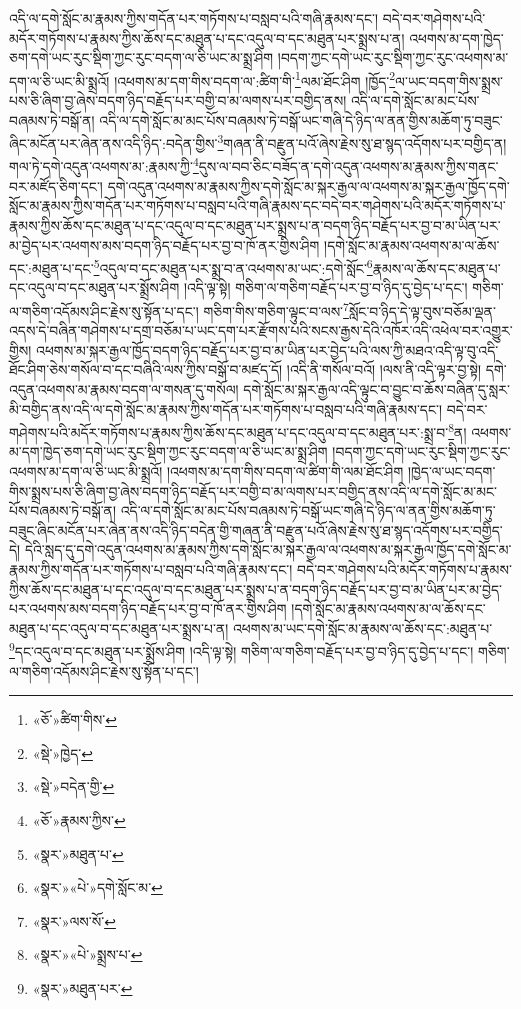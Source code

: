 འདི་ལ་དགེ་སློང་མ་རྣམས་ཀྱིས་གདོན་པར་གཏོགས་པ་བསླབ་པའི་གཞི་རྣམས་དང་། བདེ་བར་གཤེགས་པའི་མདོར་གཏོགས་པ་རྣམས་ཀྱིས་ཆོས་དང་མཐུན་པ་དང་འདུལ་བ་དང་མཐུན་པར་སྨྲས་པ་ན། འཕགས་མ་དག་ཁྱེད་ཅག་དགེ་ཡང་རུང་སྡིག་ཀྱང་རུང་བདག་ལ་ཅི་ཡང་མ་སྨྲ་ཤིག །བདག་ཀྱང་དགེ་ཡང་རུང་སྡིག་ཀྱང་རུང་འཕགས་མ་དག་ལ་ཅི་ཡང་མི་སྨྲའོ། །འཕགས་མ་དག་གིས་བདག་ལ་:ཚིག་གི་\footnote{«ཅོ་»ཚིག་གིས་}ལམ་ཐོང་ཤིག །ཁྱོད་\footnote{«སྡེ་»ཁྱེད་}ལ་ཡང་བདག་གིས་སྨྲས་པས་ཅི་ཞིག་བྱ་ཞེས་བདག་ཉིད་བརྗོད་པར་བགྱི་བ་མ་ལགས་པར་བགྱིད་ནས། འདི་ལ་དགེ་སློང་མ་མང་པོས་བཞམས་ཏེ་བསྒོ་ན། འདི་ལ་དགེ་སློང་མ་མང་པོས་བཞམས་ཏེ་བསྒོ་ཡང་གཞི་དེ་ཉིད་ལ་ནན་གྱིས་མཆོག་ཏུ་བཟུང་ཞིང་མངོན་པར་ཞེན་ནས་འདི་ཉིད་:བདེན་གྱིས་\footnote{«སྡེ་»བདེན་གྱི་}གཞན་ནི་བརྫུན་པའོ་ཞེས་རྗེས་སུ་ཐ་སྙད་འདོགས་པར་བགྱིད་ན། གལ་ཏེ་དགེ་འདུན་འཕགས་མ་:རྣམས་ཀྱི་\footnote{«ཅོ་»རྣམས་ཀྱིས་}དུས་ལ་བབ་ཅིང་བཟོད་ན་དགེ་འདུན་འཕགས་མ་རྣམས་ཀྱིས་གནང་བར་མཛོད་ཅིག་དང་། དགེ་འདུན་འཕགས་མ་རྣམས་ཀྱིས་དགེ་སློང་མ་སྐར་རྒྱལ་ལ་འཕགས་མ་སྐར་རྒྱལ་ཁྱོད་དགེ་སློང་མ་རྣམས་ཀྱིས་གདོན་པར་གཏོགས་པ་བསླབ་པའི་གཞི་རྣམས་དང་བདེ་བར་གཤེགས་པའི་མདོར་གཏོགས་པ་རྣམས་ཀྱིས་ཆོས་དང་མཐུན་པ་དང་འདུལ་བ་དང་མཐུན་པར་སྨྲས་པ་ན་བདག་ཉིད་བརྗོད་པར་བྱ་བ་མ་ཡིན་པར་མ་བྱེད་པར་འཕགས་མས་བདག་ཉིད་བརྗོད་པར་བྱ་བ་ཁོ་ནར་གྱིས་ཤིག །དགེ་སློང་མ་རྣམས་འཕགས་མ་ལ་ཆོས་དང་:མཐུན་པ་དང་\footnote{«སྣར་»མཐུན་པ་}འདུལ་བ་དང་མཐུན་པར་སྨྲ་བ་ན་འཕགས་མ་ཡང་:དགེ་སློང་\footnote{«སྣར་»«པེ་»དགེ་སློང་མ་}རྣམས་ལ་ཆོས་དང་མཐུན་པ་དང་འདུལ་བ་དང་མཐུན་པར་སྨྲོས་ཤིག །འདི་ལྟ་སྟེ། གཅིག་ལ་གཅིག་བརྗོད་པར་བྱ་བ་ཉིད་དུ་བྱེད་པ་དང་། གཅིག་ལ་གཅིག་འདོམས་ཤིང་རྗེས་སུ་སྟོན་པ་དང་། གཅིག་གིས་གཅིག་ལྟུང་བ་ལས་\footnote{«སྣར་»ལས་སོ་}སློང་བ་ཉིད་དེ་ལྟ་བུས་བཅོམ་ལྡན་འདས་དེ་བཞིན་གཤེགས་པ་དགྲ་བཅོམ་པ་ཡང་དག་པར་རྫོགས་པའི་སངས་རྒྱས་དེའི་འཁོར་འདི་འཕེལ་བར་འགྱུར་གྱིས། འཕགས་མ་སྐར་རྒྱལ་ཁྱོད་བདག་ཉིད་བརྗོད་པར་བྱ་བ་མ་ཡིན་པར་བྱེད་པའི་ལས་ཀྱི་མཐའ་འདི་ལྟ་བུ་འདི་ཐོང་ཤིག་ཅེས་གསོལ་བ་དང་བཞིའི་ལས་ཀྱིས་བསྒོ་བ་མཛད་དོ། །འདི་ནི་གསོལ་བའོ། །ལས་ནི་འདི་ལྟར་བྱ་སྟེ། དགེ་འདུན་འཕགས་མ་རྣམས་བདག་ལ་གསན་དུ་གསོལ། དགེ་སློང་མ་སྐར་རྒྱལ་འདི་ལྟུང་བ་བྱུང་བ་ཆོས་བཞིན་དུ་སླར་མི་བགྱིད་ནས་འདི་ལ་དགེ་སློང་མ་རྣམས་ཀྱིས་གདོན་པར་གཏོགས་པ་བསླབ་པའི་གཞི་རྣམས་དང་། བདེ་བར་གཤེགས་པའི་མདོར་གཏོགས་པ་རྣམས་ཀྱིས་ཆོས་དང་མཐུན་པ་དང་འདུལ་བ་དང་མཐུན་པར་:སྨྲ་བ་\footnote{«སྣར་»«པེ་»སྨྲས་པ་}ན། འཕགས་མ་དག་ཁྱེད་ཅག་དགེ་ཡང་རུང་སྡིག་ཀྱང་རུང་བདག་ལ་ཅི་ཡང་མ་སྨྲ་ཤིག །བདག་ཀྱང་དགེ་ཡང་རུང་སྡིག་ཀྱང་རུང་འཕགས་མ་དག་ལ་ཅི་ཡང་མི་སྨྲའོ། །འཕགས་མ་དག་གིས་བདག་ལ་ཚིག་གི་ལམ་ཐོང་ཤིག །ཁྱེད་ལ་ཡང་བདག་གིས་སྨྲས་པས་ཅི་ཞིག་བྱ་ཞེས་བདག་ཉིད་བརྗོད་པར་བགྱི་བ་མ་ལགས་པར་བགྱིད་ནས་འདི་ལ་དགེ་སློང་མ་མང་པོས་བཞམས་ཏེ་བསྒོ་ན། འདི་ལ་དགེ་སློང་མ་མང་པོས་བཞམས་ཏེ་བསྒོ་ཡང་གཞི་དེ་ཉིད་ལ་ནན་གྱིས་མཆོག་ཏུ་བཟུང་ཞིང་མངོན་པར་ཞེན་ནས་འདི་ཉིད་བདེན་གྱི་གཞན་ནི་བརྫུན་པའོ་ཞེས་རྗེས་སུ་ཐ་སྙད་འདོགས་པར་བགྱིད་དེ། དེའི་སླད་དུ་དགེ་འདུན་འཕགས་མ་རྣམས་ཀྱིས་དགེ་སློང་མ་སྐར་རྒྱལ་ལ་འཕགས་མ་སྐར་རྒྱལ་ཁྱོད་དགེ་སློང་མ་རྣམས་ཀྱིས་གདོན་པར་གཏོགས་པ་བསླབ་པའི་གཞི་རྣམས་དང་། བདེ་བར་གཤེགས་པའི་མདོར་གཏོགས་པ་རྣམས་ཀྱིས་ཆོས་དང་མཐུན་པ་དང་འདུལ་བ་དང་མཐུན་པར་སྨྲས་པ་ན་བདག་ཉིད་བརྗོད་པར་བྱ་བ་མ་ཡིན་པར་མ་བྱེད་པར་འཕགས་མས་བདག་ཉིད་བརྗོད་པར་བྱ་བ་ཁོ་ནར་གྱིས་ཤིག །དགེ་སློང་མ་རྣམས་འཕགས་མ་ལ་ཆོས་དང་མཐུན་པ་དང་འདུལ་བ་དང་མཐུན་པར་སྨྲས་པ་ན། འཕགས་མ་ཡང་དགེ་སློང་མ་རྣམས་ལ་ཆོས་དང་:མཐུན་པ་\footnote{«སྣར་»མཐུན་པར་}དང་འདུལ་བ་དང་མཐུན་པར་སྨྲོས་ཤིག །འདི་ལྟ་སྟེ། གཅིག་ལ་གཅིག་བརྗོད་པར་བྱ་བ་ཉིད་དུ་བྱེད་པ་དང་། གཅིག་ལ་གཅིག་འདོམས་ཤིང་རྗེས་སུ་སྟོན་པ་དང་། 